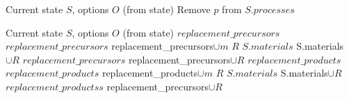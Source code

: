 \documentclass[onecolumn]{aamas}
\begin{document}
\begin{algorithm}
\caption{PurgeProcesses}
\label{alg:purge-processes}
\begin{algorithmic}[1]
\REQUIRE Current state $S$, options $O$ (from state)
        \STATE Remove $p$ from $S$.$processes$
    \ENDIF
\ENDFOR
\end{algorithmic}
\end{algorithm}

\begin{algorithm}
\caption{UpstreamDownstreamExpansion}
\label{alg:expansion}
\begin{algorithmic}[1]
\REQUIRE Current state $S$, options $O$ (from state)
    \STATE $replacement\_precursors$ \gets \emptyset
            \STATE $replacement\_precursors$ \gets replacement\_precursors$ \cup m$
        \ELSE
            \STATE $R$ \gets {}
            \STATE $S.materials$ \gets S.materials$ \cup R$
            \STATE $replacement\_precursors$ \gets replacement\_precursors$ \cup R$
        \ENDIF
    \ENDFOR
    \STATE $replacement\_products$ \gets \emptyset
            \STATE $replacement\_products$ \gets replacement\_products$ \cup m$
        \ELSE
            \STATE $R$ \gets {}
            \STATE $S.materials$ \gets S.materials$ \cup R$
            \STATE $replacement\_productss$ \gets replacement\_precursors$ \cup R$
        \ENDIF
    \ENDFOR
\ENDFOR
\end{algorithmic}
\end{algorithm}
\end{document}
